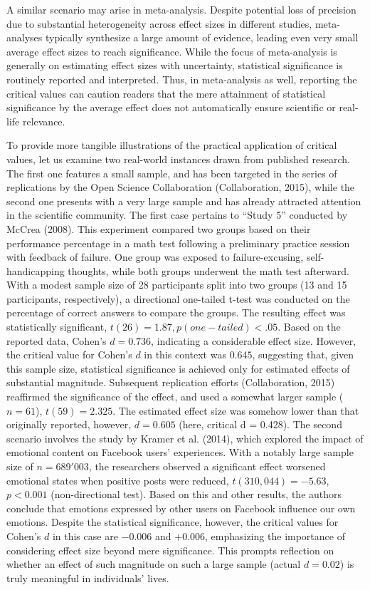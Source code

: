\documentclass[
  man]{apa7}
\begin{document}
A similar scenario may arise in meta-analysis. Despite potential loss of precision due to substantial heterogeneity across effect sizes in different studies, meta-analyses typically synthesize a large amount of evidence, leading even very small average effect sizes to reach significance. While the focus of meta-analysis is generally on estimating effect sizes with uncertainty, statistical significance is routinely reported and interpreted. Thus, in meta-analysis as well, reporting the critical values can caution readers that the mere attainment of statistical significance by the average effect does not automatically ensure scientific or real-life relevance.

To provide more tangible illustrations of the practical application of critical values, let us examine two real-world instances drawn from published research. The first one features a small sample, and has been targeted in the series of replications by the Open Science Collaboration (Collaboration, 2015), while the second one presents with a very large sample and has already attracted attention in the scientific community. The first case pertains to ``Study 5'' conducted by McCrea (2008). This experiment compared two groups based on their performance percentage in a math test following a preliminary practice session with feedback of failure. One group was exposed to failure-excusing, self-handicapping thoughts, while both groups underwent the math test afterward. With a modest sample size of 28 participants split into two groups (13 and 15 participants, respectively), a directional one-tailed t-test was conducted on the percentage of correct answers to compare the groups. The resulting effect was statistically significant, \(t(26) = 1.87, p (one-tailed) < .05\). Based on the reported data, Cohen's \(d = 0.736\), indicating a considerable effect size. However, the critical value for Cohen's \(d\) in this context was \(0.645\), suggesting that, given this sample size, statistical significance is achieved only for estimated effects of substantial magnitude. Subsequent replication efforts (Collaboration, 2015) reaffirmed the significance of the effect, and used a somewhat larger sample (\(n = 61\)), \(t(59)=2.325\). The estimated effect size was somehow lower than that originally reported, however, \(d = 0.605\) (here, critical d = 0.428). The second scenario involves the study by Kramer et al. (2014), which explored the impact of emotional content on Facebook users' experiences. With a notably large sample size of \(n = 689'003\), the researchers observed a significant effect worsened emotional states when positive posts were reduced, \(t(310,044) = −5.63\), \(p < 0.001\) (non-directional test). Based on this and other results, the authors conclude that emotions expressed by other users on Facebook influence our own emotions. Despite the statistical significance, however, the critical values for Cohen's \(d\) in this case are \(-0.006\) and \(+0.006\), emphasizing the importance of considering effect size beyond mere significance. This prompts reflection on whether an effect of such magnitude on such a large sample (actual \(d = 0.02\)) is truly meaningful in individuals' lives.
\end{document}
